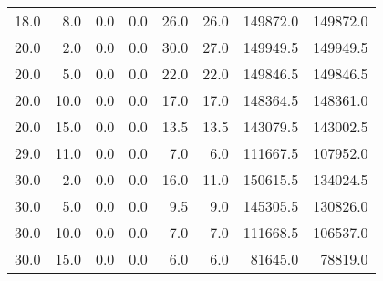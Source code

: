 \begin{tabular}{rrrrrrrr}
18.0 &  8.0 &             0.0 &        0.0 &        26.0 &       26.0 &     149872.0 &   149872.0 \\
20.0 &  2.0 &             0.0 &        0.0 &        30.0 &       27.0 &     149949.5 &   149949.5 \\
20.0 &  5.0 &             0.0 &        0.0 &        22.0 &       22.0 &     149846.5 &   149846.5 \\
20.0 & 10.0 &             0.0 &        0.0 &        17.0 &       17.0 &     148364.5 &   148361.0 \\
20.0 & 15.0 &             0.0 &        0.0 &        13.5 &       13.5 &     143079.5 &   143002.5 \\
29.0 & 11.0 &             0.0 &        0.0 &         7.0 &        6.0 &     111667.5 &   107952.0 \\
30.0 &  2.0 &             0.0 &        0.0 &        16.0 &       11.0 &     150615.5 &   134024.5 \\
30.0 &  5.0 &             0.0 &        0.0 &         9.5 &        9.0 &     145305.5 &   130826.0 \\
30.0 & 10.0 &             0.0 &        0.0 &         7.0 &        7.0 &     111668.5 &   106537.0 \\
30.0 & 15.0 &             0.0 &        0.0 &         6.0 &        6.0 &      81645.0 &    78819.0 \\
\bottomrule
\end{tabular}
